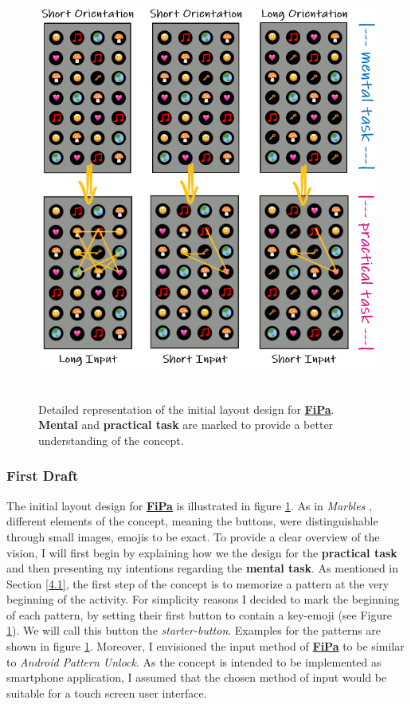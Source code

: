 \begin{figure}[t!]
\centering
\includegraphics[width=14cm, height=14cm]{Chapters/graphics/firstdraft.PNG}
\caption{Detailed representation of the initial layout design for \underline{\textbf{FiPa}}. \textbf{Mental} and \textbf{practical task} are marked to provide a better understanding of the concept.}
\label{fig:firstdraft}
\end{figure}

\subsubsection{First Draft} \label{4.2.2.1}
The initial layout design for \underline{\textbf{FiPa}} is illustrated in figure \ref{fig:firstdraft}. As in \textit{Marbles} \cite{Marbles, Zezschwitz}, different elements of the concept, meaning the buttons, were distinguishable through small images, emojis to be exact. To provide a clear overview of the vision, I will first begin by explaining how we the design for the \textbf{practical task} and then presenting my intentions regarding the \textbf{mental task}. As mentioned in Section \ref{4.1}, the first step of the concept is to memorize a pattern at the very beginning of the activity. For simplicity reasons I decided to mark the beginning of each pattern, by setting their first button to contain a key-emoji (see Figure \ref{fig:firstdraft}). We will call this button the \textit{starter-button}. Examples for the patterns are shown in figure \ref{fig:firstdraft}. Moreover, I envisioned the input method of \underline{\textbf{FiPa}} to be similar to \textit{Android Pattern Unlock}. As the concept is intended to be implemented as smartphone application, I assumed that the chosen method of input would be suitable for a touch screen user interface. \\

